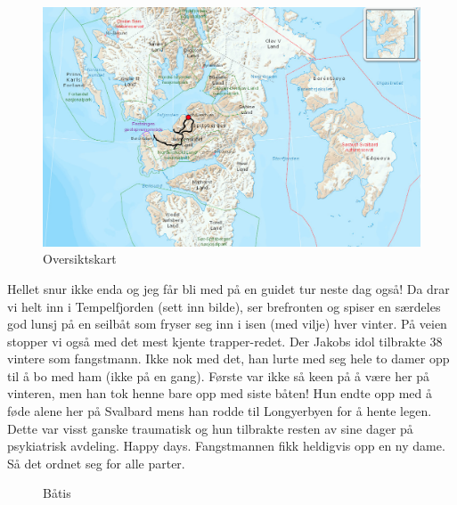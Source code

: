 \begin{figure}[h!]
\centering
\includegraphics[scale=0.22]{Turbarentsburgstor}
\caption{Oversiktskart}
\label{fig:barentsburgoversiktskart}
\end{figure}
Hellet snur ikke enda og jeg får bli med på en guidet tur neste dag
også! Da drar vi helt inn i Tempelfjorden (sett inn bilde), ser
brefronten og spiser en særdeles god lunsj på en seilbåt som fryser
seg inn i isen (med vilje) hver vinter. På veien stopper vi også med
det mest kjente trapper-redet. Der Jakobs idol tilbrakte 38 vintere
som fangstmann. Ikke nok med det, han lurte med seg hele to damer opp
til å bo med ham (ikke på en gang). Første var ikke så keen på å være her på vinteren,
men han tok henne bare opp med siste båten! Hun endte opp med å føde
alene her på Svalbard mens han rodde til Longyerbyen for å hente
legen. Dette var visst ganske traumatisk og hun tilbrakte resten av
sine dager på psykiatrisk avdeling. Happy days. Fangstmannen fikk
heldigvis opp en ny dame. Så det ordnet seg for alle parter.\\

\begin{figure}[h!]
	\centering
\noindent{}	
	\caption{Båtis}
\label{fig:båtis}
\end{figure}


